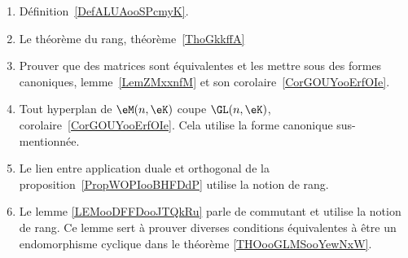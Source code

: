 
    \begin{enumerate}
        \item Définition~\ref{DefALUAooSPcmyK}.
        \item Le théorème du rang, théorème~\ref{ThoGkkffA}
        \item Prouver que des matrices sont équivalentes et les mettre sous des formes canoniques, lemme~\ref{LemZMxxnfM} et son corolaire~\ref{CorGOUYooErfOIe}.
        \item Tout hyperplan de \( \eM(n,\eK)\) coupe \( \GL(n,\eK)\), corolaire~\ref{CorGOUYooErfOIe}. Cela utilise la forme canonique sus-mentionnée.
        \item Le lien entre application duale et orthogonal de la proposition~\ref{PropWOPIooBHFDdP} utilise la notion de rang.
        \item Le lemme \ref{LEMooDFFDooJTQkRu} parle de commutant et utilise la notion de rang. Ce lemme sert à prouver diverses conditions équivalentes à être un endomorphisme cyclique dans le théorème \ref{THOooGLMSooYewNxW}.
        \end{enumerate}

